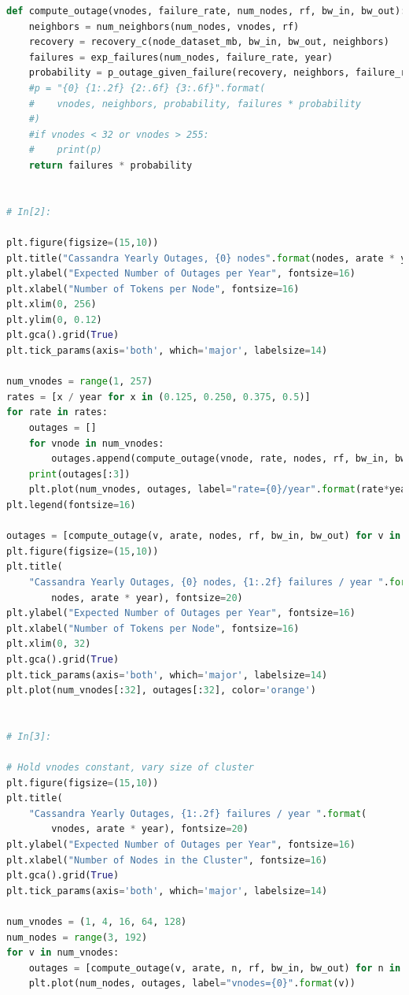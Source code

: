 \documentclass{article}
\begin{document}
\begin{lstlisting}[language=Python]
def compute_outage(vnodes, failure_rate, num_nodes, rf, bw_in, bw_out):
    neighbors = num_neighbors(num_nodes, vnodes, rf)
    recovery = recovery_c(node_dataset_mb, bw_in, bw_out, neighbors)
    failures = exp_failures(num_nodes, failure_rate, year)
    probability = p_outage_given_failure(recovery, neighbors, failure_rate)
    #p = "{0} {1:.2f} {2:.6f} {3:.6f}".format(
    #    vnodes, neighbors, probability, failures * probability
    #)
    #if vnodes < 32 or vnodes > 255:
    #    print(p)
    return failures * probability


# In[2]:

plt.figure(figsize=(15,10))
plt.title("Cassandra Yearly Outages, {0} nodes".format(nodes, arate * year), fontsize=20)
plt.ylabel("Expected Number of Outages per Year", fontsize=16)
plt.xlabel("Number of Tokens per Node", fontsize=16)
plt.xlim(0, 256)
plt.ylim(0, 0.12)
plt.gca().grid(True)
plt.tick_params(axis='both', which='major', labelsize=14)

num_vnodes = range(1, 257)
rates = [x / year for x in (0.125, 0.250, 0.375, 0.5)]
for rate in rates:
    outages = []
    for vnode in num_vnodes:
        outages.append(compute_outage(vnode, rate, nodes, rf, bw_in, bw_out))
    print(outages[:3])
    plt.plot(num_vnodes, outages, label="rate={0}/year".format(rate*year))
plt.legend(fontsize=16)

outages = [compute_outage(v, arate, nodes, rf, bw_in, bw_out) for v in num_vnodes]
plt.figure(figsize=(15,10))
plt.title(
    "Cassandra Yearly Outages, {0} nodes, {1:.2f} failures / year ".format(
        nodes, arate * year), fontsize=20)
plt.ylabel("Expected Number of Outages per Year", fontsize=16)
plt.xlabel("Number of Tokens per Node", fontsize=16)
plt.xlim(0, 32)
plt.gca().grid(True)
plt.tick_params(axis='both', which='major', labelsize=14)
plt.plot(num_vnodes[:32], outages[:32], color='orange')


# In[3]:

# Hold vnodes constant, vary size of cluster
plt.figure(figsize=(15,10))
plt.title(
    "Cassandra Yearly Outages, {1:.2f} failures / year ".format(
        vnodes, arate * year), fontsize=20)
plt.ylabel("Expected Number of Outages per Year", fontsize=16)
plt.xlabel("Number of Nodes in the Cluster", fontsize=16)
plt.gca().grid(True)
plt.tick_params(axis='both', which='major', labelsize=14)

num_vnodes = (1, 4, 16, 64, 128)
num_nodes = range(3, 192)
for v in num_vnodes:
    outages = [compute_outage(v, arate, n, rf, bw_in, bw_out) for n in num_nodes]
    plt.plot(num_nodes, outages, label="vnodes={0}".format(v))


\end{lstlisting}
\end{document}
